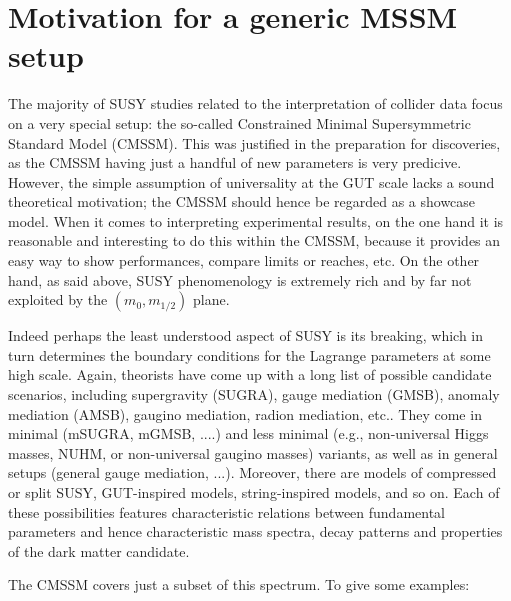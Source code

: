 \section{Motivation for a generic MSSM setup}
\label{sec:motivation}

The majority of SUSY studies related to the interpretation of collider data focus on a very special 
setup: the so-called Constrained Minimal Supersymmetric Standard Model (CMSSM). 
This was justified in the preparation for discoveries, as the CMSSM 
having just a handful of new parameters is very predicive. However, 
the simple assumption of universality at the GUT scale lacks a sound 
theoretical motivation; the CMSSM should hence be regarded as a showcase 
model. When it comes to interpreting experimental results, on the 
one hand it is reasonable and interesting to do this within the CMSSM, 
because it provides an easy way to show performances, compare limits 
or reaches, etc. On the other hand, as said above, SUSY phenomenology 
is extremely rich and by far not exploited by the $(m_0,m_{1/2})$ plane.

Indeed perhaps the least understood aspect of SUSY is its breaking, 
which in turn determines the boundary conditions for the Lagrange 
parameters at some high scale. Again, theorists have come up with a 
long list of possible candidate scenarios, including 
supergravity (SUGRA), 
gauge mediation (GMSB), 
anomaly mediation (AMSB), 
gaugino mediation, radion mediation, etc.. 
They come in minimal (mSUGRA, mGMSB, ....) and  
less minimal (e.g., non-universal Higgs masses, NUHM,  
or non-universal gaugino masses) variants, as well as in general setups 
(general gauge mediation, ...). 
Moreover, there are models of compressed or split SUSY, 
GUT-inspired models, string-inspired models, and so on. 
Each of these possibilities features characteristic relations between 
fundamental parameters and hence characteristic mass spectra, decay 
patterns and properties of the dark matter candidate. 

The CMSSM covers just a subset of this spectrum. To give some 
examples:


